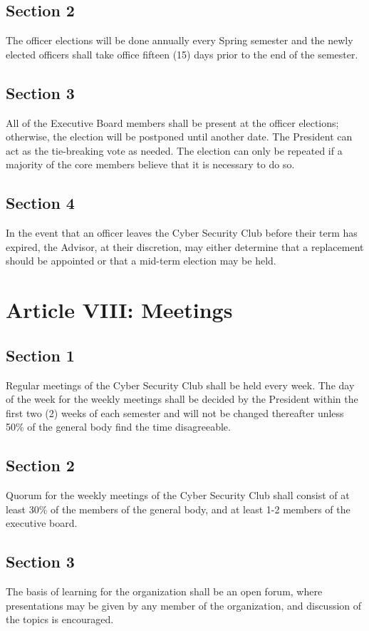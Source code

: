 \documentclass[10pt]{article}
\begin{document}
\subsection*{Section 2}
The officer elections will be done annually every Spring semester and the newly elected officers shall
take office fifteen (15) days prior to the end of the semester.
\subsection*{Section 3}
All of the Executive Board members shall be present at the officer elections; otherwise, the election
will be postponed until another date. The President can act as the tie-breaking vote as needed. The
election can only be repeated if a majority of the core members believe that it is necessary to do so.
\subsection*{Section 4}
In the event that an officer leaves the Cyber Security Club before their term has expired, the Advisor, at
their discretion, may either determine that a replacement should be appointed or that a mid-term
election may be held.
\vspace{0.2in}

\section*{Article VIII: Meetings}
\subsection*{Section 1}
Regular meetings of the Cyber Security Club shall be held every week. The day of the week for the
weekly meetings shall be decided by the President within the first two (2) weeks of each semester and
will not be changed thereafter unless 50\% of the general body find the time disagreeable.
\subsection*{Section 2}
Quorum for the weekly meetings of the Cyber Security Club shall consist of at least 30\% of the
members of the general body, and at least 1-2 members of the executive board.
\subsection*{Section 3}
The basis of learning for the organization shall be an open forum, where presentations may be given by
any member of the organization, and discussion of the topics is encouraged.
\end{document}
